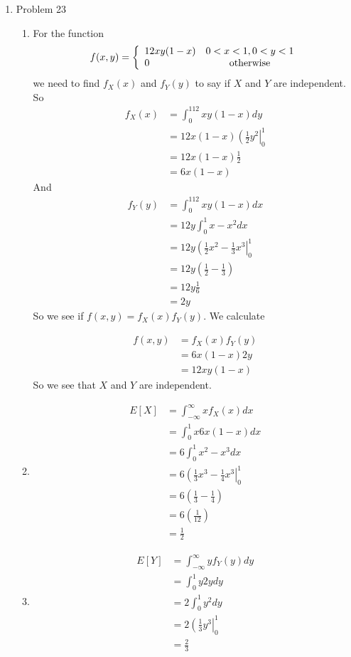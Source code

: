 \documentclass[11pt]{article}
\begin{document}
\begin{enumerate}
\begin{enumerate}
\end{enumerate}

\item Problem 23
\begin{enumerate}
\item
For the function
$$f(x,y)=\left\{\begin{array}{lc}
	12xy(1-x) 	&0<x<1,0<y<1\\
	0	&\textnormal{otherwise}
	\end{array}\right.$$
we need to find $f_X(x)$ and $f_Y(y)$ to say if $X$ and $Y$ are independent. So
\begin{align*}
f_X(x) &= \int_0^112xy(1-x)dy\\
&= 12x(1-x)\left(\frac{1}{2}y^2\right|_0^1\\
&= 12x(1-x)\frac{1}{2}\\
&= 6x(1-x)
\end{align*}
And
\begin{align*}
f_Y(y) &= \int_0^112xy(1-x)dx\\
&= 12y\int_0^1x-x^2dx\\
&= 12y\left(\frac{1}{2}x^2-\frac{1}{3}x^3\right|_0^1\\
&= 12y\left(\frac{1}{2}-\frac{1}{3}\right)\\
&= 12y\frac{1}{6}\\
&= 2y
\end{align*}
So we see if $f(x,y) = f_X(x)f_Y(y)$. We calculate 

\begin{align*}
f(x,y) &= f_X(x)f_Y(y)\\  
&= 6x(1-x)2y\\
&= 12xy(1-x) 
\end{align*}
So we see that $X$ and $Y$ are independent.

\item
\begin{align*}
E[X] &= \int_{-\infty}^{\infty}xf_X(x)dx\\
&= \int_0^1 x6x(1-x)dx\\
&= 6\int_0^1 x^2-x^3dx\\
&=  6\left(\frac{1}{3}x^3-\frac{1}{4}x^3\right|_0^1\\
&=  6\left(\frac{1}{3}-\frac{1}{4}\right)\\
&=  6\left(\frac{1}{12}\right)\\
&=  \frac{1}{2}
\end{align*}

\item
\begin{align*}
E[Y] &= \int_{-\infty}^{\infty}yf_Y(y)dy\\
&= \int_0^1 y2ydy\\
&= 2\int_0^1 y^2dy\\
&= 2\left(\frac{1}{3}y^3\right|_0^1\\
&= \frac{2}{3}
\end{align*}


\end{enumerate}
\end{enumerate}
\end{document}
